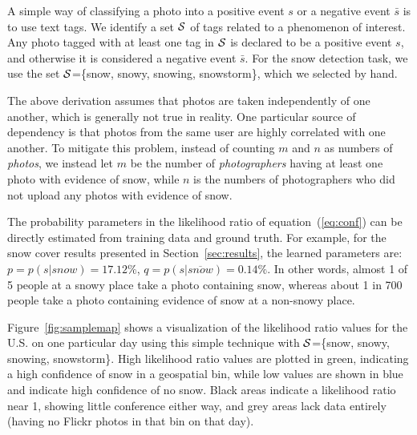 A simple way of classifying a photo into a positive event $s$ or a
negative event $\bar{s}$ is to use text tags. We identify a
set ${\cal S}$ of tags related to a phenomenon of
interest. Any photo tagged with at least one tag in ${\cal S}$ is
declared to be a positive event $s$, and otherwise it is considered a
negative event $\bar{s}$. For the snow detection task, we use the set
${\cal S}$=\{snow, snowy, snowing, snowstorm\}, which we selected
by hand.


The above derivation assumes that photos are taken independently of
one another, which is generally not true in reality. One particular
source of dependency is that photos from the same user are highly
correlated with one another.  To mitigate this problem, instead of
counting $m$ and $n$ as numbers of \textit{photos}, we instead let $m$ be 
the number of \textit{photographers} having at least one photo with evidence of snow,
while $n$ is the numbers of photographers who did not upload any
photos with evidence of snow.

The probability parameters in the likelihood ratio of
equation~(\ref{eq:conf}) can be directly estimated from training data
and ground truth. For example, for the snow cover results
presented in Section~\ref{sec:results}, the learned parameters are: $p
= p(s|snow) = 17.12\%$, $q = p(s|\overline{snow}) = 0.14\%$.  In other
words, almost 1 of 5 people at a snowy place take a photo containing
snow, whereas about 1 in 700 people take a photo containing evidence
of snow at a non-snowy place.

Figure~\ref{fig:samplemap} shows a visualization of the likelihood
ratio values for the U.S. on one particular day using this simple
technique with ${\cal S}$=\{snow, snowy, snowing, snowstorm\}.  High
likelihood ratio values are plotted
in green, indicating a high confidence of snow in a geospatial bin,
while low values are shown in blue and indicate high confidence of 
no snow.  Black areas indicate a likelihood ratio 
near 1, showing little conference either way, and grey areas lack
data entirely (having no Flickr photos in that bin on that day).




